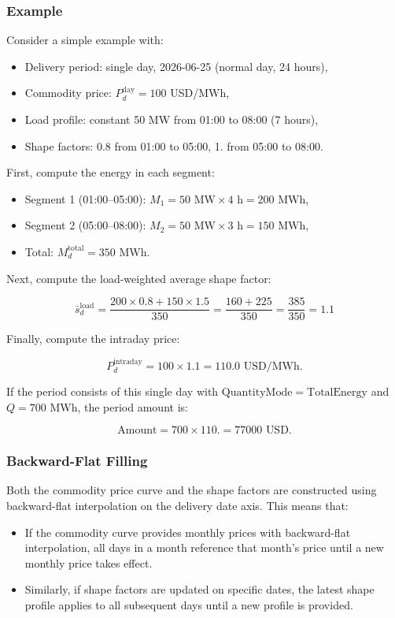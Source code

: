 \subsubsection{Example}

Consider a simple example with:
\begin{itemize}
\item Delivery period: single day, 2026-06-25 (normal day, 24 hours),
\item Commodity price: $P_d^{\mathrm{day}} = 100$ USD/MWh,
\item Load profile: constant 50 MW from 01:00 to 08:00 (7 hours),
\item Shape factors: 0.8 from 01:00 to 05:00, 1. from 05:00 to 08:00.
\end{itemize}

First, compute the energy in each segment:
\begin{itemize}
\item Segment 1 (01:00--05:00): $M_1 = 50 \text{ MW} \times 4 \text{ h} = 200 \text{ MWh}$,
\item Segment 2 (05:00--08:00): $M_2 = 50 \text{ MW} \times 3 \text{ h} = 150 \text{ MWh}$,
\item Total: $M_d^{\mathrm{total}} = 350 \text{ MWh}$.
\end{itemize}

Next, compute the load-weighted average shape factor:

$$
\bar{s}_d^{\mathrm{load}} = \frac{200 \times 0.8 + 150 \times 1.5}{350} = \frac{160 + 225}{350} = \frac{385}{350} = 1.1
$$

Finally, compute the intraday price:

$$
P_d^{\mathrm{intraday}} = 100 \times 1.1 = 110.0 \text{ USD/MWh}.
$$

If the period consists of this single day with $\mathrm{QuantityMode} = \mathrm{TotalEnergy}$ and $Q = 700$ MWh, the period amount is:

$$
\mathrm{Amount} = 700 \times 110. = 77000 \text{ USD}.
$$

\subsubsection{Backward-Flat Filling}

Both the commodity price curve and the shape factors are constructed using backward-flat interpolation on the delivery date axis. This means that:

\begin{itemize}
\item If the commodity curve provides monthly prices with backward-flat interpolation, all days in a month reference that month's price until a new monthly price takes effect.
\item Similarly, if shape factors are updated on specific dates, the latest shape profile applies to all subsequent days until a new profile is provided.
\end{itemize}

